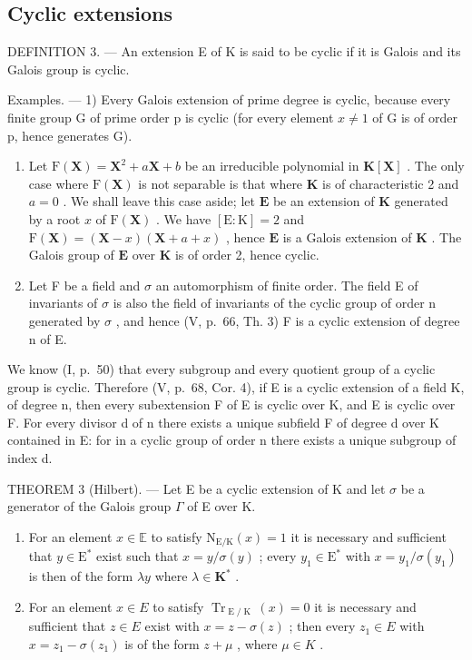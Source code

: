 \subsection{Cyclic extensions}

DEFINITION 3. --- An extension E of K is said to be cyclic if it is Galois and its Galois group is cyclic.

Examples. --- 1) Every Galois extension of prime degree is cyclic, because every finite group G of prime order p is cyclic (for every element \(x \neq 1\) of G is of order p, hence generates G).

\begin{enumerate}
\def\labelenumi{\arabic{enumi})}
\setcounter{enumi}{1}
\item
  Let \(\mathrm{F}(\mathbf{X}) = \mathbf{X}^2 + a\mathbf{X} + b\) be an irreducible polynomial in \(\mathbf{K}[\mathbf{X}]\) . The only case where \(\mathrm{F}(\mathbf{X})\) is not separable is that where \(\mathbf{K}\) is of characteristic 2 and \(a = 0\) . We shall leave this case aside; let \(\mathbf{E}\) be an extension of \(\mathbf{K}\) generated by a root \(x\) of \(\mathrm{F}(\mathbf{X})\) . We have \([\mathrm{E}:\mathrm{K}] = 2\) and \(\mathrm{F}(\mathbf{X}) = (\mathbf{X} - x)(\mathbf{X} + a + x)\) , hence \(\mathbf{E}\) is a Galois extension of \(\mathbf{K}\) . The Galois group of \(\mathbf{E}\) over \(\mathbf{K}\) is of order 2, hence cyclic.
\item
  Let F be a field and \(\sigma\) an automorphism of finite order. The field E of invariants of \(\sigma\) is also the field of invariants of the cyclic group of order n generated by \(\sigma\) , and hence (V, p.~66, Th. 3) F is a cyclic extension of degree n of E.
\end{enumerate}

We know (I, p.~50) that every subgroup and every quotient group of a cyclic group is cyclic. Therefore (V, p.~68, Cor. 4), if E is a cyclic extension of a field K, of degree n, then every subextension F of E is cyclic over K, and E is cyclic over F. For every divisor d of n there exists a unique subfield F of degree d over K contained in E: for in a cyclic group of order n there exists a unique subgroup of index d.

THEOREM 3 (Hilbert). --- Let E be a cyclic extension of K and let \(\sigma\) be a generator of the Galois group \(\Gamma\) of E over K.

\begin{enumerate}
\def\labelenumi{\alph{enumi})}
\item
  For an element \(x \in \mathbb{E}\) to satisfy \(\mathrm{N}_{\mathrm{E} / \mathrm{K}}(x) = 1\) it is necessary and sufficient that \(y \in \mathrm{E}^*\) exist such that \(x = y / \sigma(y)\) ; every \(y_1 \in \mathrm{E}^*\) with \(x = y_1 / \sigma(y_1)\) is then of the form \(\lambda y\) where \(\lambda \in \mathbf{K}^*\) .
\item
  For an element \(x \in E\) to satisfy \(\operatorname{Tr}_{\operatorname{E}/\operatorname{K}}(x) = 0\) it is necessary and sufficient that \(z \in E\) exist with \(x = z - \sigma(z)\) ; then every \(z_{1} \in E\) with \(x = z_{1} - \sigma(z_{1})\) is of the form \(z + \mu\) , where \(\mu \in K\) .
\end{enumerate}

